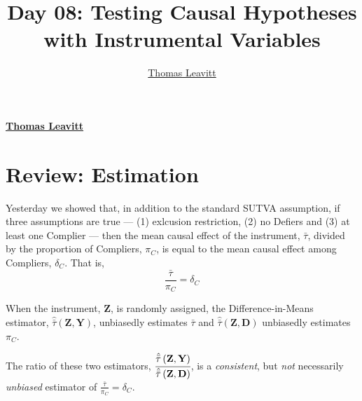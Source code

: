 \documentclass[12pt,leqno]{article}
\title{Day 08: Testing Causal Hypotheses with Instrumental Variables  }
\author{\Large \href{mailto:t.leavitt718@gmail.com}{Thomas Leavitt}\vspace{0.05in} \newline\normalsize\emph{}  }
\date{}
\newcommand*{\authorfont}{\fontfamily{phv}\selectfont}
\theoremstyle{newstyle}
\begin{document}
	
%    


{%
\setlength{\parindent}{0pt}
\thispagestyle{plain}
{\fontsize{18}{20}\selectfont\raggedright 
\maketitle  %

}

{
   \vskip 13.5pt\relax \normalsize\fontsize{11}{12} 
\textbf{\authorfont \href{mailto:t.leavitt718@gmail.com}{Thomas Leavitt}} \hskip 15pt \emph{\small }   

}

}





\vskip 6.5pt

\noindent  \hypertarget{review-estimation}{%
\section{Review: Estimation}\label{review-estimation}}

Yesterday we showed that, in addition to the standard SUTVA assumption,
if three assumptions are true --- (1) exlcusion restriction, (2) no
Defiers and (3) at least one Complier --- then the mean causal effect of
the instrument, \(\bar{\tau}\), divided by the proportion of Compliers,
\(\pi_C\), is equal to the mean causal effect among Compliers,
\(\delta_C\). That is, \begin{equation}
\frac{\bar{\tau}}{\pi_C} = \delta_C
\end{equation}

When the instrument, \(\mathbf{Z}\), is randomly assigned, the
Difference-in-Means estimator,
\(\hat{\bar{\tau}}\left(\mathbf{Z}, \mathbf{Y}\right)\), unbiasedly
estimates \(\bar{\tau}\) and
\(\hat{\bar{\tau}}\left(\mathbf{Z}, \mathbf{D}\right)\) unbiasedly
estimates \(\pi_C\).

The ratio of these two estimators,
\(\cfrac{\hat{\bar{\tau}}\left(\mathbf{Z}, \mathbf{Y}\right)}{\hat{\bar{\tau}}\left(\mathbf{Z}, \mathbf{D}\right)}\),
is a \textit{consistent}, but \textit{not} necessarily \textit{unbiased}
estimator of \(\frac{\bar{\tau}}{\pi_C} = \delta_C\).
\end{document}
